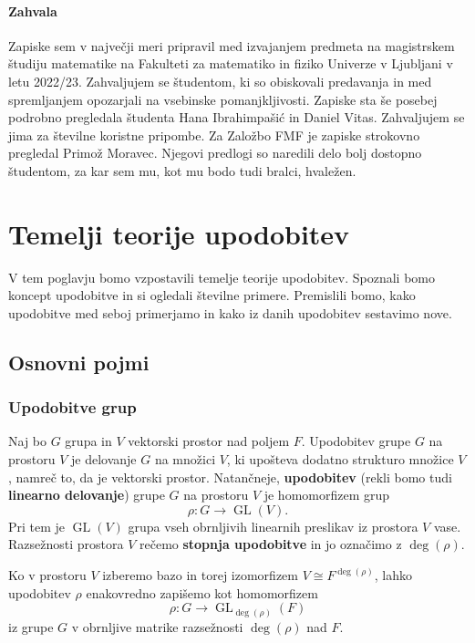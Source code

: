 \documentclass[11pt]{book}
\DeclareMathOperator\GL{GL}
\def\definicija{\color{rdeca}\bf}
\theoremstyle{definition}
\theoremstyle{zgled}
\theoremstyle{zgledbrezstevilke}
\theoremstyle{odprtproblem}
\theoremstyle{domacanaloga}
\theoremstyle{izrek}
\begin{document}
\subsubsection{Zahvala}

Zapiske sem v največji meri pripravil med izvajanjem predmeta na magistrskem študiju matematike na Fakulteti za matematiko in fiziko Univerze v Ljubljani v letu 2022/23. Zahvaljujem se študentom, ki so obiskovali predavanja in med spremljanjem opozarjali na vsebinske pomanjkljivosti. Zapiske sta še posebej podrobno pregledala študenta Hana Ibrahimpašić in Daniel Vitas. Zahvaljujem se jima za številne koristne pripombe. Za Založbo FMF je zapiske strokovno pregledal Primož Moravec. Njegovi predlogi so naredili delo bolj dostopno študentom, za kar sem mu, kot mu bodo tudi bralci, hvaležen.

\chapter{Temelji teorije upodobitev}

V tem poglavju bomo vzpostavili temelje teorije upodobitev. Spoznali bomo koncept upodobitve in si ogledali številne primere. Premislili bomo, kako upodobitve med seboj primerjamo in kako iz danih upodobitev sestavimo nove.

\section{Osnovni pojmi}

\subsection{Upodobitve grup}

Naj bo $G$ grupa in $V$ vektorski prostor nad poljem $F$. Upodobitev grupe $G$ na prostoru $V$ je delovanje $G$ na množici $V$, ki upošteva dodatno strukturo množice $V$, namreč to, da je vektorski prostor. Natančneje, {\definicija upodobitev} (rekli bomo tudi {\definicija linearno delovanje}) grupe $G$ na prostoru $V$ je homomorfizem grup
\[
    \rho \colon G \to \GL(V).
\]
Pri tem je $\GL(V)$ grupa vseh obrnljivih linearnih preslikav iz prostora $V$ vase. Razsežnosti prostora $V$ rečemo {\definicija stopnja upodobitve} in jo označimo z $\deg(\rho)$. 

Ko v prostoru $V$ izberemo bazo in torej izomorfizem $V \cong F^{\deg(\rho)}$, lahko upodobitev $\rho$ enakovredno zapišemo kot homomorfizem
\[
    \rho \colon G \to \textstyle \GL_{\deg(\rho)}(F)
\]
iz grupe $G$ v obrnljive matrike razsežnosti $\deg(\rho)$ nad $F$.
\end{document}
